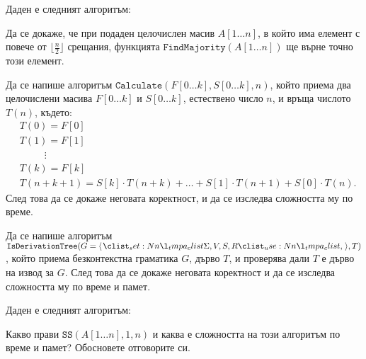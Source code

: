 \begin{problem}
Даден е следният алгоритъм:


Да се докаже, че при подаден целочислен масив $A[1 \dots n]$, в който има елемент с повече от $\lfloor \frac{n}{2} \rfloor$ срещания,
функцията $\mathtt{FindMajority}(A[1 \dots n])$ ще върне точно този елемент.
\end{problem}

\begin{problem}
Да се напише алгоритъм $\mathtt{Calculate}(F[0 \dots k], S[0 \dots k], n)$, който приема два целочислени масива $F[0 \dots k]$ и $S[0 \dots k]$, естествено число $n$, и връща числото $T(n)$, където:
\begin{align*}
     & T(0) = F[0]                                                                         \\
     & T(1) = F[1]                                                                         \\
     & \phantom{00000} \vdots                                                              \\
     & T(k) = F[k]                                                                         \\
     & T(n + k + 1) = S[k] \cdot T(n + k) + \dots + S[1] \cdot T(n + 1) + S[0] \cdot T(n).
\end{align*}
След това да се докаже неговата коректност, и да се изследва сложността му по време.
\end{problem}

\begin{problem}
Да се напише алгоритъм $\mathtt{IsDerivationTree}(G = \opair{\Sigma, V, S, R}, T)$, който приема безконтекстна граматика $G$, дърво $T$, и проверява дали $T$ е дърво на извод за $G$.
След това да се докаже неговата коректност и да се изследва сложността му по време и памет.
\end{problem}

\newpage

\begin{problem}
Даден е следният алгоритъм:

Какво прави $\mathtt{SS}(A[1 \dots n], 1, n)$ и каква е сложността на този алгоритъм по време и памет?
Обосновете отговорите си.
\end{problem}